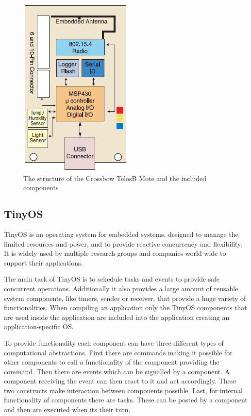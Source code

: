 \begin{figure}[htbp]
	\centering
    \includegraphics[scale=0.7]{content/images/Mote1}
   	\caption{The structure of the Crossbow TelosB Mote and the included components \cite{Telosb}}
    \label{fig:telosb}
\end{figure}
 
\subsection{TinyOS}
TinyOS is an operating system for embedded systems, designed to manage the limited resources and power, and to provide reactive concurrency and flexibility. It is widely used by multiple research groups and companies world wide to support their applications.

The main task of TinyOS is to schedule tasks and events to provide safe concurrent operations. Additionally it also provides a large amount of reusable system components, like timers, sender or receiver, that provide a huge variety of functionalities. When compiling an application only the TinyOS components that are used inside the application are included into the application creating an application-specific OS.

To provide functionality each component can have three different types of computational abstractions. First there are commands making it possible for other components to call a functionality of the component providing the command. Then there are events which can be signalled by a component. A component receiving the event can then react to it and act accordingly. These two constructs make interaction between components possible. Last, for internal functionality of components there are tasks. These can be posted by a component and then are executed when its their turn. 

